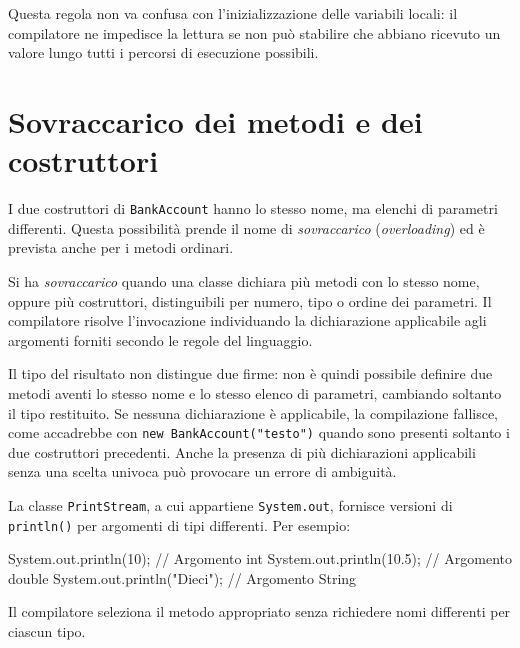 Questa regola non va confusa con l'inizializzazione delle variabili
locali: il compilatore ne impedisce la lettura se non può stabilire
che abbiano ricevuto un valore lungo tutti i percorsi di esecuzione
possibili.

\section{Sovraccarico dei metodi e dei costruttori}
\label{sec:fi-java-classi-overloading}

I due costruttori di \texttt{BankAccount} hanno lo stesso nome,
ma elenchi di parametri differenti. Questa possibilità prende
il nome di \emph{sovraccarico} (\emph{overloading}) ed è prevista
anche per i metodi ordinari.

\begin{definition}[Overloading]
\label{def:fi-java-classi-overloading}
Si ha \emph{sovraccarico} quando una classe dichiara più metodi
con lo stesso nome, oppure più costruttori, distinguibili per
numero, tipo o ordine dei parametri. Il compilatore risolve
l'invocazione individuando la dichiarazione applicabile agli
argomenti forniti secondo le regole del linguaggio.
\end{definition}

Il tipo del risultato non distingue due firme: non è quindi
possibile definire due metodi aventi lo stesso nome e lo stesso
elenco di parametri, cambiando soltanto il tipo restituito.
Se nessuna dichiarazione è applicabile, la compilazione fallisce,
come accadrebbe con \texttt{new BankAccount("testo")} quando
sono presenti soltanto i due costruttori precedenti. Anche la
presenza di più dichiarazioni applicabili senza una scelta
univoca può provocare un errore di ambiguità.

\begin{example}
La classe \texttt{PrintStream}, a cui appartiene
\texttt{System.out}, fornisce versioni di \texttt{println()}
per argomenti di tipi differenti. Per esempio:

\begin{unipdcode}[language=Java]
System.out.println(10);       // Argomento int
System.out.println(10.5);     // Argomento double
System.out.println("Dieci");  // Argomento String
\end{unipdcode}
Il compilatore seleziona il metodo appropriato senza
richiedere nomi differenti per ciascun tipo.
\end{example}

